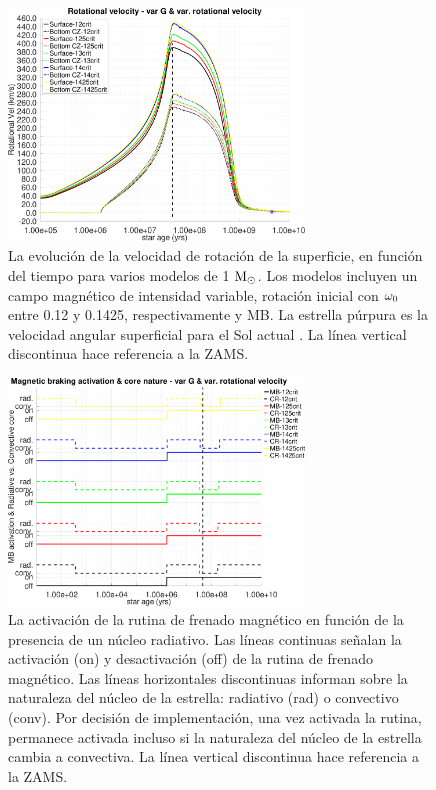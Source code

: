 \begin{figure}
	\centering
	\includegraphics[width=0.7\textwidth]{img/paper2/rot_vel_var_vel_var_g3.pdf}
	\caption{La evolución de la velocidad de rotación de la superficie, en función del tiempo para varios modelos de 1 $\mathrm{M}_\odot$. Los modelos incluyen un campo magnético de intensidad variable, rotación inicial con $\omega_{\mathrm{0}}$ entre 0.12 y 0.1425, respectivamente y MB. La estrella púrpura es la velocidad angular superficial para el Sol actual \cite{Gill2012}. La línea vertical discontinua hace referencia a la ZAMS.}
	\label{fig:rot_vel_var_vel_var_g3}
\end{figure}

\begin{figure}
	\centering
	\includegraphics[width=0.7\textwidth]{img/paper2/mb_act_var_vel_g3.pdf}
	\caption{La activación de la rutina de frenado magnético en función de la presencia de un núcleo radiativo. Las líneas continuas señalan la activación (on) y desactivación (off) de la rutina de frenado magnético. Las líneas horizontales discontinuas informan sobre la naturaleza del núcleo de la estrella: radiativo (rad) o convectivo (conv). Por decisión de implementación, una vez activada la rutina, permanece activada incluso si la naturaleza del núcleo de la estrella cambia a convectiva. La línea vertical discontinua hace referencia a la ZAMS.}
	\label{fig:mb_act_var_vel_g3}
\end{figure}

